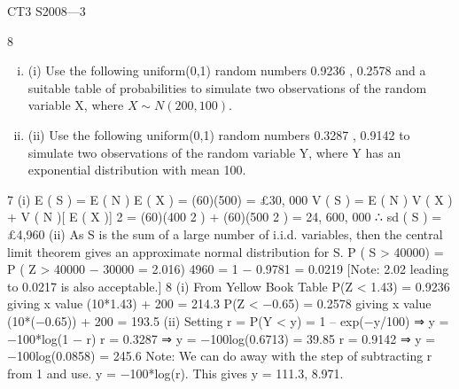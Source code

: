 \documentclass[a4paper,12pt]{article}
\begin{document}
CT3 S2008—3

8
\begin{enumerate}[(i)]
\item (i)
Use the following uniform(0,1) random numbers
0.9236 , 0.2578
and a suitable table of probabilities to simulate two observations of the random
variable X, where $X \sim N(200,100)$.
\item (ii)
Use the following uniform(0,1) random numbers
0.3287 , 0.9142
to simulate two observations of the random variable Y, where Y has an exponential distribution with mean 100.
\end{enumerate}

7
(i)
E ( S ) = E ( N ) E ( X ) = (60)(500) = £30, 000
V ( S ) = E ( N ) V ( X ) + V ( N )[ E ( X )] 2
= (60)(400 2 ) + (60)(500 2 ) = 24, 600, 000 ∴ sd ( S ) = £4,960
(ii)
As S is the sum of a large number of i.i.d. variables, then the central limit
theorem gives an approximate normal distribution for S.
P ( S > 40000) = P ( Z >
40000 − 30000
= 2.016)
4960
= 1 − 0.9781 = 0.0219
[Note: 2.02 leading to 0.0217 is also acceptable.]
8
(i)
From Yellow Book Table
P(Z < 1.43) = 0.9236 giving x value (10*1.43) + 200 = 214.3
P(Z < −0.65) = 0.2578 giving x value (10*(−0.65)) + 200 = 193.5
(ii)
Setting r = P(Y < y) = 1 – exp(−y/100) ⇒ y = −100*log(1 − r)
r = 0.3287 ⇒ y = −100log(0.6713) = 39.85
r = 0.9142 ⇒ y = −100log(0.0858) = 245.6
Note: We can do away with the step of subtracting r from 1 and use.
y = −100*log(r). This gives y = 111.3, 8.971.
\end{document}
